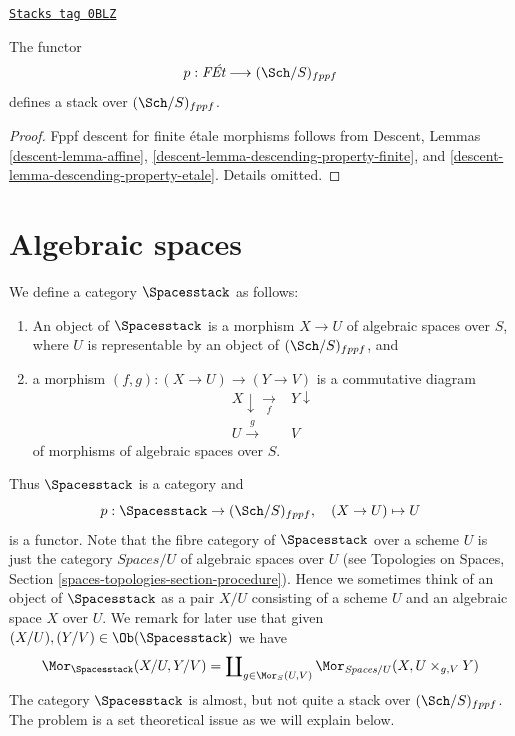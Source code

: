 \begin{lemma}
\label{examples-stacks-lemma-finite-etale-stack}
\href{https://stacks.math.columbia.edu/tag/0BLZ}{\texttt{Stacks tag 0BLZ}}

The functor
$$
p : \textit{F\'Et} \longrightarrow (\Sch/S)_{fppf}
$$
defines a stack over $(\Sch/S)_{fppf}$.
\end{lemma}

\begin{proof}
Fppf descent for finite \'etale morphisms follows from
Descent, Lemmas \ref{descent-lemma-affine},
\ref{descent-lemma-descending-property-finite}, and
\ref{descent-lemma-descending-property-etale}.
Details omitted.
\end{proof}

\section{Algebraic spaces}
\label{examples-stacks-section-stack-of-spaces}
We define a category $\Spacesstack$ as follows:
\begin{enumerate}
\item An object of $\Spacesstack$ is a morphism $X \to U$
of algebraic spaces over $S$, where $U$ is representable by an object of
$(\Sch/S)_{fppf}$, and
\item a morphism $(f, g) : (X \to U) \to (Y \to V)$
is a commutative diagram
$$
\begin{array}{cc}X \downarrow\underset{f}{\longrightarrow} & Y \downarrow \\ U \overset{g}{\longrightarrow} & V\end{array}
$$
of morphisms of algebraic spaces over $S$.
\end{enumerate}
Thus $\Spacesstack$ is a category and
$$
p : \Spacesstack \to (\Sch/S)_{fppf},
\quad
(X \to U) \mapsto U
$$
is a functor. Note that the fibre category of $\Spacesstack$ over
a scheme $U$ is just the category $\textit{Spaces}/U$ of
algebraic spaces over $U$ (see
Topologies on Spaces, Section \ref{spaces-topologies-section-procedure}).
Hence we sometimes think of an object of $\Spacesstack$ as a
pair $X/U$ consisting of a scheme $U$ and an algebraic space $X$ over $U$.
We remark for later use that given
$(X/U), (Y/V) \in \Ob(\Spacesstack)$
we have
\begin{equation}
\label{equation-morphisms-spaces}
\Mor_{\Spacesstack}(X/U, Y/V)
=
\coprod\nolimits_{g \in \Mor_S(U, V)}
\Mor_{\textit{Spaces}/U}(X, U \times_{g, V} Y)
\end{equation}
The category $\Spacesstack$ is almost, but not quite a stack
over $(\Sch/S)_{fppf}$. The problem is a set theoretical
issue as we will explain below.

